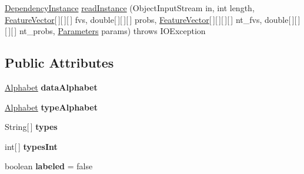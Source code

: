 \begin{DoxyCompactItemize}
\item 
\hyperlink{classmstparser_1_1DependencyInstance}{DependencyInstance} \hyperlink{classmstparser_1_1DependencyPipe_ac85ec2345561e573fe598a255117c378}{readInstance} (ObjectInputStream in, int length, \hyperlink{classmstparser_1_1FeatureVector}{FeatureVector}\mbox{[}$\,$\mbox{]}\mbox{[}$\,$\mbox{]}\mbox{[}$\,$\mbox{]} fvs, double\mbox{[}$\,$\mbox{]}\mbox{[}$\,$\mbox{]}\mbox{[}$\,$\mbox{]} probs, \hyperlink{classmstparser_1_1FeatureVector}{FeatureVector}\mbox{[}$\,$\mbox{]}\mbox{[}$\,$\mbox{]}\mbox{[}$\,$\mbox{]}\mbox{[}$\,$\mbox{]} nt\_\-fvs, double\mbox{[}$\,$\mbox{]}\mbox{[}$\,$\mbox{]}\mbox{[}$\,$\mbox{]}\mbox{[}$\,$\mbox{]} nt\_\-probs, \hyperlink{classmstparser_1_1Parameters}{Parameters} params)  throws IOException 
\end{DoxyCompactItemize}
\subsection*{Public Attributes}
\begin{DoxyCompactItemize}
\item 
\hypertarget{classmstparser_1_1DependencyPipe_a6586ec82ff8a563e2518dd4d4b6c896f}{
\hyperlink{classmstparser_1_1Alphabet}{Alphabet} {\bfseries dataAlphabet}}
\label{classmstparser_1_1DependencyPipe_a6586ec82ff8a563e2518dd4d4b6c896f}

\item 
\hypertarget{classmstparser_1_1DependencyPipe_ae9423fcfcf30c013a05ce22fd1145c8f}{
\hyperlink{classmstparser_1_1Alphabet}{Alphabet} {\bfseries typeAlphabet}}
\label{classmstparser_1_1DependencyPipe_ae9423fcfcf30c013a05ce22fd1145c8f}

\item 
\hypertarget{classmstparser_1_1DependencyPipe_ad8b9e8dfcb27e849b0b46bdf508ca83f}{
String\mbox{[}$\,$\mbox{]} {\bfseries types}}
\label{classmstparser_1_1DependencyPipe_ad8b9e8dfcb27e849b0b46bdf508ca83f}

\item 
\hypertarget{classmstparser_1_1DependencyPipe_a138e7bd469d3b16a6f211de1e08d4655}{
int\mbox{[}$\,$\mbox{]} {\bfseries typesInt}}
\label{classmstparser_1_1DependencyPipe_a138e7bd469d3b16a6f211de1e08d4655}

\item 
\hypertarget{classmstparser_1_1DependencyPipe_a87501f52449f26b233b6d7dd701d2170}{
boolean {\bfseries labeled} = false}
\label{classmstparser_1_1DependencyPipe_a87501f52449f26b233b6d7dd701d2170}

\end{DoxyCompactItemize}
